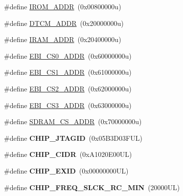 \begin{DoxyCompactItemize}
\item 
\#define \mbox{\hyperlink{group__SAME70J21__definitions_ga694212ffb8c2786bacee3d0ad6020bda}{I\+R\+O\+M\+\_\+\+A\+D\+DR}}~(0x00800000u)
\item 
\#define \mbox{\hyperlink{group__SAME70J21__definitions_ga26626a425f7ebb3a0c2dbc276f0d9f78}{D\+T\+C\+M\+\_\+\+A\+D\+DR}}~(0x20000000u)
\item 
\#define \mbox{\hyperlink{group__SAME70J21__definitions_gaae45ac2ef16942159481c767ac4805cf}{I\+R\+A\+M\+\_\+\+A\+D\+DR}}~(0x20400000u)
\item 
\#define \mbox{\hyperlink{group__SAME70J21__definitions_ga9bcbb97ddae3b2cc5e2c9613d33f66b4}{E\+B\+I\+\_\+\+C\+S0\+\_\+\+A\+D\+DR}}~(0x60000000u)
\item 
\#define \mbox{\hyperlink{group__SAME70J21__definitions_gaaddd9fdbbc77c9aced5308819f502a26}{E\+B\+I\+\_\+\+C\+S1\+\_\+\+A\+D\+DR}}~(0x61000000u)
\item 
\#define \mbox{\hyperlink{group__SAME70J21__definitions_ga058a35f9991487dc2dd12ada792d0730}{E\+B\+I\+\_\+\+C\+S2\+\_\+\+A\+D\+DR}}~(0x62000000u)
\item 
\#define \mbox{\hyperlink{group__SAME70J21__definitions_gad66ebdd0fc33ec3cf85dbaa14bbf05d9}{E\+B\+I\+\_\+\+C\+S3\+\_\+\+A\+D\+DR}}~(0x63000000u)
\item 
\#define \mbox{\hyperlink{group__SAME70J21__definitions_ga61b7db25daf759c2a2beb6e5a0b57a84}{S\+D\+R\+A\+M\+\_\+\+C\+S\+\_\+\+A\+D\+DR}}~(0x70000000u)
\item 
\mbox{\label{group__SAME70J21__definitions_gaa614519778eec0df55d3eeab3223e3f6}} 
\#define {\bfseries C\+H\+I\+P\+\_\+\+J\+T\+A\+G\+ID}~(0x05\+B3\+D03\+F\+U\+L)
\item 
\mbox{\label{group__SAME70J21__definitions_ga1e1ae44dd9269a8a98c1d7e7a60e9fbd}} 
\#define {\bfseries C\+H\+I\+P\+\_\+\+C\+I\+DR}~(0x\+A1020\+E00\+U\+L)
\item 
\mbox{\label{group__SAME70J21__definitions_ga35123717aa86b76bb6b73cf3adc4c2e6}} 
\#define {\bfseries C\+H\+I\+P\+\_\+\+E\+X\+ID}~(0x00000000\+U\+L)
\item 
\mbox{\label{group__SAME70J21__definitions_ga0e868bf27426399dfdcb3a9dfc3733c4}} 
\#define {\bfseries C\+H\+I\+P\+\_\+\+F\+R\+E\+Q\+\_\+\+S\+L\+C\+K\+\_\+\+R\+C\+\_\+\+M\+IN}~(20000\+U\+L)

\end{DoxyCompactItemize}
